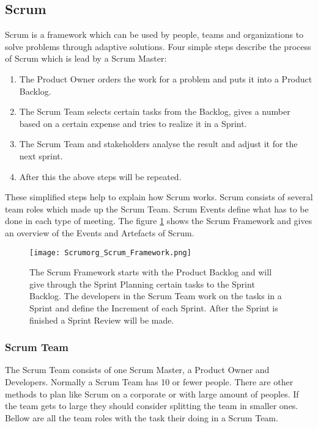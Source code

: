 \subsection{Scrum} \label{sec:Scrum}
Scrum is a framework which can be used by people, teams and organizations to solve problems through adaptive solutions. Four simple steps describe the process of Scrum which is lead by a Scrum Master:
\begin{enumerate}
    \item The Product Owner orders the work for a problem and puts it into a Product Backlog.
    \item The Scrum Team selects certain tasks from the Backlog, gives a number based on a certain expense and tries to realize it in a Sprint.
    \item The Scrum Team and stakeholders analyse the result and adjust it for the next sprint.
    \item After this the above steps will be repeated.
\end{enumerate}

These simplified steps help to explain how Scrum works. Scrum consists of several team roles which made up the Scrum Team. Scrum Events define what has to be done in each type of meeting. The figure \ref{fig:Scrum Framework} shows the Scrum Framework and gives an overview of the Events and Artefacts of Scrum. \cite{scrum_guide}


\begin{figure}[H]
    \centering
    \texttt{[image: Scrumorg\_Scrum\_Framework.png]}
    \caption{The Scrum Framework starts with the Product Backlog and will give through the Sprint Planning certain tasks to the Sprint Backlog. The developers in the Scrum Team work on the tasks in a Sprint and define the Increment of each Sprint. After the Sprint is finished a Sprint Review will be made. \cite{scrum_guide}}
    \label{fig:Scrum Framework}
\end{figure}


\subsubsection{Scrum Team} \label{sec:Scrum Team}
The Scrum Team consists of one Scrum Master, a Product Owner and Developers. Normally a Scrum Team has 10 or fewer people. There are other methods to plan like Scrum on a corporate or with large amount of peoples. If the team gets to large they should consider splitting the team in smaller ones. Bellow are all the team roles with the task their doing in a Scrum Team. \cite{scrum_guide}

